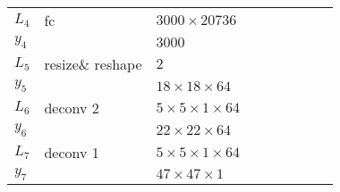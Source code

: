 \begin{table}[h!]
{\begin{tabular}{|lllllllll|}
			\multicolumn{1}{|l|}{$L_4$}   & fc               & \multicolumn{1}{l|}{$3000\times20736$}           &                & \multicolumn{1}{l|}{}                      \\
			\multicolumn{1}{|l|}{$y_4$}   &                  & \multicolumn{1}{l|}{$3000$}                      &                & \multicolumn{1}{l|}{}                      \\ \hline

			\multicolumn{1}{|l|}{$L_5$}   & resize\& reshape & \multicolumn{1}{l|}{$2$}                         &                & \multicolumn{1}{l|}{}                      \\
			\multicolumn{1}{|l|}{$y_5$}   &                  & \multicolumn{1}{l|}{$18\times18\times 64$}       &                & \multicolumn{1}{l|}{}                      \\ \hline

			\multicolumn{1}{|l|}{$L_6$}   & deconv 2         & \multicolumn{1}{l|}{$5\times 5\times1\times 64$} &                & \multicolumn{1}{l|}{}                      \\
			\multicolumn{1}{|l|}{$y_6$}   &                  & \multicolumn{1}{l|}{$22\times22\times64$}        &                & \multicolumn{1}{l|}{}                      \\ \hline


			\multicolumn{1}{|l|}{$L_7$}   & deconv 1         & \multicolumn{1}{l|}{$5\times 5\times1\times 64$} &                & \multicolumn{1}{l|}{}                      \\
			\multicolumn{1}{|l|}{$y_7$}   &                  & \multicolumn{1}{l|}{$47\times47\times1$}         &                & \multicolumn{1}{l|}{}                      \\ \hline
		\end{tabular}
		\caption{} \label{net:2}
	}
\end{table}

